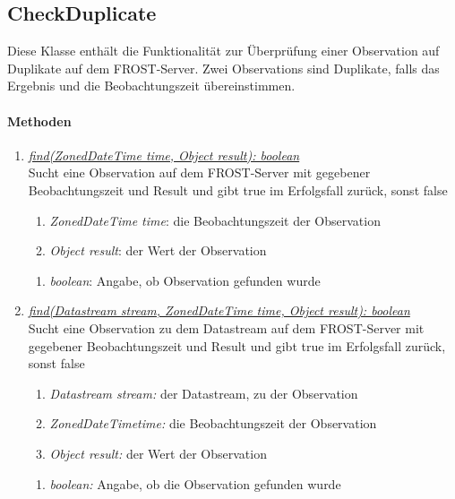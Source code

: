 \subsection*{CheckDuplicate}\label{dupl}

Diese Klasse enthält die Funktionalität zur Überprüfung einer Observation auf Duplikate auf dem FROST-Server.
Zwei Observations sind Duplikate, falls das Ergebnis und die Beobachtungszeit übereinstimmen.

\paragraph{Methoden}
	
\begin{enumerate}[+]
	
	\item \underline{\textit{find(ZonedDateTime time, Object result): boolean}}\\
	Sucht eine Observation auf dem FROST-Server mit gegebener Beobachtungszeit und Result und gibt true im Erfolgsfall zurück, sonst false
	\begin{enumerate}[$\bullet$]
		\item \textit{ZonedDateTime time}: die Beobachtungszeit der Observation
		\item \textit{Object result}: der Wert der Observation
	\end{enumerate}
	\vspace{-0.2cm}
	\begin{enumerate}[$\circ$]
		\item \textit{boolean}: Angabe, ob Observation gefunden wurde
	\end{enumerate}
	
	\item \underline{\textit{find(Datastream stream, ZonedDateTime time, Object result): boolean}} \\
	Sucht eine Observation zu dem Datastream auf dem FROST-Server mit gegebener Beobachtungszeit und Result und gibt true im Erfolgsfall zurück, sonst false
	\begin{enumerate}[$\bullet$]
		\item \textit{Datastream stream:} der Datastream, zu der Observation
		\item \textit{ZonedDateTimetime:} die Beobachtungszeit der Observation
		\item \textit{Object result:} der Wert der Observation
	\end{enumerate}
	\vspace{-0.2cm}
	\begin{enumerate}[$\circ$]
		\item \textit{boolean:} Angabe, ob die Observation gefunden wurde
	\end{enumerate}


\end{enumerate}
